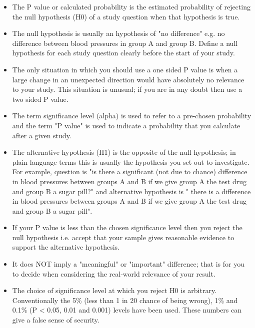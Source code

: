 \documentclass[]{report}
\begin{document}
	\begin{itemize}
		\item The P value or calculated probability is the estimated probability of rejecting the null hypothesis (H0) of a study question when that hypothesis is true.
		
		\item The null hypothesis is usually an hypothesis of "no difference" e.g. no difference between blood pressures in group A and group B. Define a null hypothesis for each study question clearly before the start of your study.
		
		\item The only situation in which you should use a one sided P value is when a large change in an unexpected direction would have absolutely no relevance to your study. This situation is unusual; if you are in any doubt then use a two sided P value.
		
		\item The term significance level (alpha) is used to refer to a pre-chosen probability and the term "P value" is used to indicate a probability that you calculate after a given study.
		
		\item The alternative hypothesis (H1) is the opposite of the null hypothesis; in plain language terms this is usually the hypothesis you set out to investigate. For example, question is "is there a significant (not due to chance) difference in blood pressures between groups A and B if we give group A the test drug and group B a sugar pill?" and alternative hypothesis is " there is a difference in blood pressures between groups A and B if we give group A the test drug and group B a sugar pill".
		
		
		\item If your P value is less than the chosen significance level then you reject the null hypothesis i.e. accept that your sample gives reasonable evidence to support the alternative hypothesis. \item It does NOT imply a "meaningful" or "important" difference; that is for you to decide when considering the real-world relevance of your result.
		
		\item The choice of significance level at which you reject H0 is arbitrary. Conventionally the 5\% (less than 1 in 20 chance of being wrong), 1\% and 0.1\% (P < 0.05, 0.01 and 0.001) levels have been used. These numbers can give a false sense of security.
	\end{itemize} 
	
\end{document}
